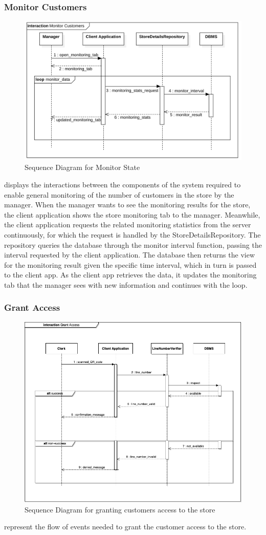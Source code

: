 \subsubsection{Monitor Customers}
\begin{figure}[H]
    \centering
    \includegraphics[height=0.4\textwidth]{Images/SequenceDiagrams/MonitorState.png}
    \caption{Sequence Diagram for Monitor State}
    \label{fig:SDMonitorState}
\end{figure}
 displays the interactions between the components of the system required to enable general monitoring of the number of customers in the store by the manager.
When the manager wants to see the monitoring results for the store, the client application shows the store monitoring tab to the manager.
Meanwhile, the client application requests the related monitoring statistics from the server continuously, for which the request is handled by the StoreDetailsRepository.
The repository queries the database through the monitor interval function, passing the interval requested by the client application.
The database then returns the view for the monitoring result given the specific time interval, which in turn is passed to the client app.
As the client app retrieves the data, it updates the monitoring tab that the manager sees with new information and continues with the loop.

\subsubsection{Grant Access}
\begin{figure}[H]
    \centering
    \includegraphics[height=0.6\textwidth]{Images/SequenceDiagrams/GrantAccess.png}
    \caption{Sequence Diagram for granting customers access to the store}
    \label{fig:SDGrantAccess}
\end{figure} represent the flow of events needed to grant the customer access to the store.

